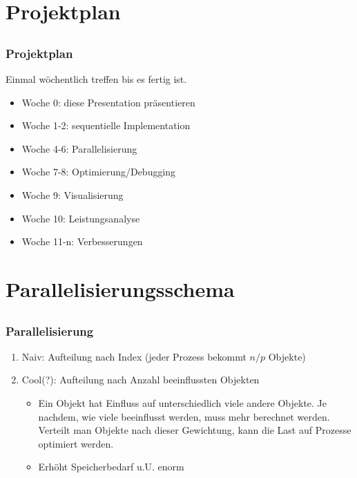 \documentclass{beamer}
\begin{document}

\section{Projektplan}
\subsection{}


\begin{frame}
    \frametitle{Projektplan}
    Einmal wöchentlich treffen bis es fertig ist.
    \begin{itemize}
        \item Woche 0: diese Presentation präsentieren
        \item Woche 1-2: sequentielle Implementation
        \item Woche 4-6: Parallelisierung
        \item Woche 7-8: Optimierung/Debugging
        \item Woche 9: Visualisierung
        \item Woche 10: Leistungsanalyse
        \item Woche 11-n: Verbesserungen
    \end{itemize}
\end{frame}


\section{Parallelisierungsschema}
\subsection{}


\begin{frame}
    \frametitle{Parallelisierung}
    \begin{enumerate}
        \item Naiv: Aufteilung nach Index (jeder Prozess bekommt $n/p$ Objekte)
        \item Cool(?): Aufteilung nach Anzahl beeinflussten Objekten
        \begin{itemize}
            \item Ein Objekt hat Einfluss auf unterschiedlich viele andere Objekte.
                Je nachdem, wie viele beeinflusst werden, muss mehr berechnet werden.
                Verteilt man Objekte nach dieser Gewichtung, kann die Last auf Prozesse
                optimiert werden.
            \item Erhöht Speicherbedarf u.U. enorm
        \end{itemize}
    \end{enumerate}
\end{frame}

\end{document}
